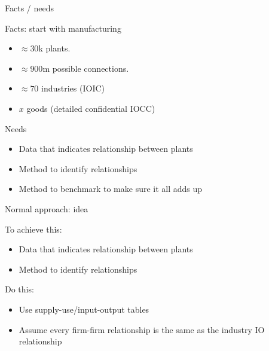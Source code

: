 \documentclass[12pt]{beamer}
\begin{document}
\begin{frame}{Facts / needs}
\begin{block}{Facts: start with manufacturing}
\begin{itemize}
\item $\approx 30$k plants. 
\item $\approx 900$m possible connections.
\item $\approx 70$ industries (IOIC)
\item $x$ goods (detailed confidential IOCC)
\end{itemize}
\end{block}

\begin{block}{Needs}
\begin{itemize}
\item Data that indicates relationship between plants
\item Method to identify relationships
\item Method to benchmark to make sure it all adds up
\end{itemize}
\end{block}

\end{frame}



\begin{frame}{Normal approach: idea}

\begin{block}{To achieve this:}
\begin{itemize}
\item Data that indicates relationship between plants
\item Method to identify relationships
\end{itemize}
\end{block}

\begin{block}{Do this:}
\begin{itemize}
\item Use supply-use/input-output tables
\item Assume every firm-firm relationship is the same as the industry IO relationship
\end{itemize}
\end{block}

\end{frame}
\end{document}
